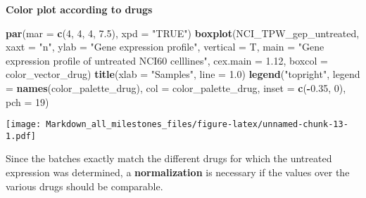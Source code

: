 \documentclass[]{article}
\newenvironment{Shaded}{\begin{snugshade}}{\end{snugshade}}
\newcommand{\DataTypeTok}[1]{\textcolor[rgb]{0.13,0.29,0.53}{#1}}
\newcommand{\DecValTok}[1]{\textcolor[rgb]{0.00,0.00,0.81}{#1}}
\newcommand{\FloatTok}[1]{\textcolor[rgb]{0.00,0.00,0.81}{#1}}
\newcommand{\KeywordTok}[1]{\textcolor[rgb]{0.13,0.29,0.53}{\textbf{#1}}}
\newcommand{\NormalTok}[1]{#1}
\newcommand{\OperatorTok}[1]{\textcolor[rgb]{0.81,0.36,0.00}{\textbf{#1}}}
\newcommand{\StringTok}[1]{\textcolor[rgb]{0.31,0.60,0.02}{#1}}
\begin{document}
\textbf{Color plot according to drugs}

\begin{Shaded}
\begin{Highlighting}[]
\KeywordTok{par}\NormalTok{(}\DataTypeTok{mar =} \KeywordTok{c}\NormalTok{(}\DecValTok{4}\NormalTok{, }\DecValTok{4}\NormalTok{, }\DecValTok{4}\NormalTok{, }\FloatTok{7.5}\NormalTok{), }\DataTypeTok{xpd =} \StringTok{"TRUE"}\NormalTok{)}
\KeywordTok{boxplot}\NormalTok{(NCI_TPW_gep_untreated, }
        \DataTypeTok{xaxt =} \StringTok{"n"}\NormalTok{, }
        \DataTypeTok{ylab =} \StringTok{"Gene expression profile"}\NormalTok{, }
        \DataTypeTok{vertical =}\NormalTok{  T, }
        \DataTypeTok{main =} \StringTok{"Gene expression profile of untreated NCI60 celllines"}\NormalTok{, }
        \DataTypeTok{cex.main =} \FloatTok{1.12}\NormalTok{,}
        \DataTypeTok{boxcol =}\NormalTok{ color_vector_drug)}
\KeywordTok{title}\NormalTok{(}\DataTypeTok{xlab =} \StringTok{"Samples"}\NormalTok{, }\DataTypeTok{line =} \FloatTok{1.0}\NormalTok{)}
\KeywordTok{legend}\NormalTok{(}\StringTok{"topright"}\NormalTok{, }
       \DataTypeTok{legend =} \KeywordTok{names}\NormalTok{(color_palette_drug), }
       \DataTypeTok{col =}\NormalTok{ color_palette_drug,}
       \DataTypeTok{inset =} \KeywordTok{c}\NormalTok{(}\OperatorTok{-}\FloatTok{0.35}\NormalTok{, }\DecValTok{0}\NormalTok{),}
       \DataTypeTok{pch =} \DecValTok{19}\NormalTok{)}
\end{Highlighting}
\end{Shaded}

\texttt{[image: Markdown\_all\_milestones\_files/figure-latex/unnamed-chunk-13-1.pdf]}

Since the batches exactly match the different drugs for which the
untreated expression was determined, a \textbf{normalization} is
necessary if the values over the various drugs should be comparable.
\end{document}
